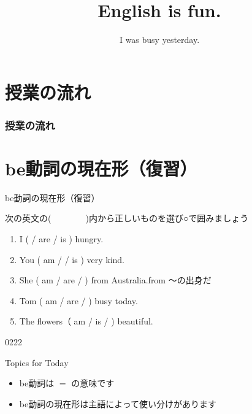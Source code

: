 \documentclass[aspectratio=169,xcolor={dvipsnames,table}]{beamer}
\title{English is fun.}
\subtitle{I was busy yesterday.}
\author{}
\institute[]{}
\date[]
\newcommand{\myaudio}[1]{\href{#1}{\faVolumeUp}}
\begin{document}
\begin{frame}[plain]
  \titlepage
\end{frame}

\section*{授業の流れ}
\begin{frame}[plain]
  \frametitle{授業の流れ}
  \tableofcontents
\end{frame}


\section{be動詞の現在形（復習）}

\begin{frame}[plain]{be動詞の現在形（復習）}

次の英文の(~~~~~~~~)内から正しいものを選び○で囲みましょう

\begin{enumerate}
 \item I (  / are  / is ) hungry.
 \item You ( am /  / is ) very kind.
 \item She ( am / are /  ) from Australia.\hfill{\scriptsize from ～の出身だ}
 \item Tom ( am / are /  ) busy today.
 \item The flowers（ am / is /  ) beautiful.
\end{enumerate}

\hfill{\tiny 0222}{\scriptsize \myaudio{./audio/024_past_be_01.mp3}}

\begin{block}{Topics for Today}
\pause
\begin{itemize}[square]\small
 \item be動詞は $=$ の意味です
 \item be動詞の現在形は主語によって使い分けがあります
\end{itemize}
     \end{block}

\end{frame}
\end{document}
